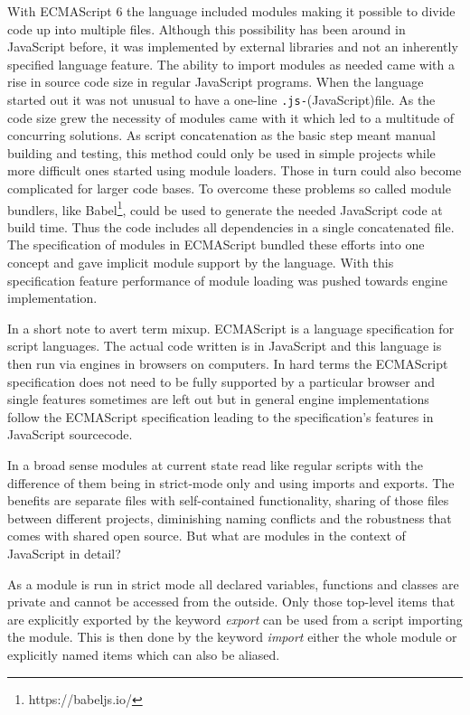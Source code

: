 With ECMAScript 6 the language included modules making it possible to divide code up into multiple files. Although this possibility has been around in JavaScript before, it was implemented by external libraries and not an inherently specified language feature. The ability to import modules as needed came with a rise in source code size in regular JavaScript programs. When the language started out it was not unusual to have a one-line \texttt{.js-}(JavaScript)file. As the code size grew the necessity of modules came with it which led to a multitude of concurring solutions. As script concatenation as the basic step meant manual building and testing, this method could only be used in simple projects while more difficult ones started using module loaders. Those in turn could also become complicated for larger code bases. To overcome these problems so called module bundlers, like Babel\footnote{https://babeljs.io/}, could be used to generate the needed JavaScript code at build time. Thus the code includes all dependencies in a single concatenated file. The specification of modules in ECMAScript bundled these efforts into one concept and gave implicit module support by the language. With this specification feature performance of module loading was pushed towards engine implementation.

In a short note to avert term mixup. ECMAScript is a language specification for script languages. The actual code written is in JavaScript and this language is then run via engines in browsers on computers. In hard terms the ECMAScript specification does not need to be fully supported by a particular browser and single features sometimes are left out but in general engine implementations follow the ECMAScript specification leading to the specification's features in JavaScript sourcecode.

In a broad sense modules at current state read like regular scripts with the difference of them being in strict-mode only and using imports and exports. The benefits are separate files with self-contained functionality, sharing of those files between different projects, diminishing naming conflicts and the robustness that comes with shared open source. But what are modules in the context of JavaScript in detail?

As a module is run in strict mode all declared variables, functions and classes are private and cannot be accessed from the outside. Only those top-level items that are explicitly exported by the keyword \emph{export} can be used from a script importing the module. This is then done by the keyword \emph{import} either the whole module or explicitly named items which can also be aliased.

